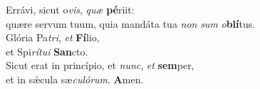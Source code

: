 \evenverse Errávi, sicut o\textit{vis}, \textit{quæ} \textbf{pé}riit:~\*\\
\evenverse quære servum tuum, quia mandáta tua \textit{non} \textit{sum} \textit{o}\textbf{blí}tus.\\
\oddverse Glória Pa\textit{tri}, \textit{et} \textbf{Fí}lio,~\*\\
\oddverse et Spi\textit{rí}\textit{tu}\textit{i} \textbf{San}cto.\\
\evenverse Sicut erat in princípio, et \textit{nunc}, \textit{et} \textbf{sem}per,~\*\\
\evenverse et in sǽcula sæ\textit{cu}\textit{ló}\textit{rum}. \textbf{A}men.\\
